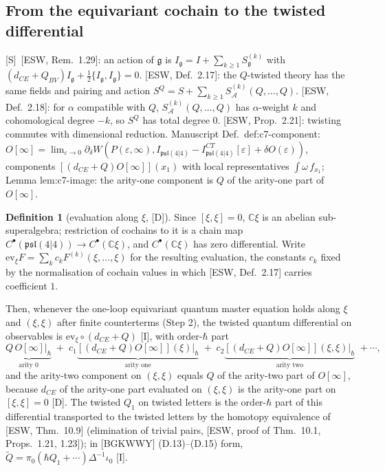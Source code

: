 \documentclass[11pt]{article}
\theoremstyle{definition}
\newtheorem{definition}{Definition}
\newcommand{\Sl}{\textup{[S]}}
\newcommand{\Dl}{\textup{[D]}}
\newcommand{\Il}{\textup{[I]}}
\begin{document}
\subsection{From the equivariant cochain to the twisted differential}

\Sl\ [ESW, Rem.~1.29]: an action of $\mathfrak g$ is $I_{\mathfrak g}=I+\sum_{k\ge1}S^{(k)}_{\mathfrak g}$ with $(d_{CE}+Q_{BV})I_{\mathfrak g}+\tfrac12\{I_{\mathfrak g},I_{\mathfrak g}\}=0$. [ESW, Def.~2.17]: the $Q$-twisted theory has the same fields and pairing and action $S^Q=S+\sum_{k\ge1}S^{(k)}_{\mathcal A}(Q,\dots,Q)$. [ESW, Def.~2.18]: for $\alpha$ compatible with $Q$, $S^{(k)}_{\mathcal A}(Q,\dots,Q)$ has $\alpha$-weight $k$ and cohomological degree $-k$, so $S^Q$ has total degree $0$. [ESW, Prop.~2.21]: twisting commutes with dimensional reduction. Manuscript Def.~def:c7-component: $O[\infty]=\lim_{\varepsilon\to0}\partial_\delta W(P(\varepsilon,\infty),I_{\mathfrak{psl}(4|4)}-I^{CT}_{\mathfrak{psl}(4|4)}[\varepsilon]+\delta O(\varepsilon))$, components $[(d_{CE}+Q)O[\infty]](x_1)$ with local representatives $\int\omega\,f_{x_1}$; Lemma lem:c7-image: the arity-one component is $Q$ of the arity-one part of $O[\infty]$.

\begin{definition}[evaluation along $\xi$, \Dl]
Since $[\xi,\xi]=0$, $\mathbb C\xi$ is an abelian sub-superalgebra; restriction of cochains to it is a chain map $C^\bullet(\mathfrak{psl}(4|4))\to C^\bullet(\mathbb C\xi)$, and $C^\bullet(\mathbb C\xi)$ has zero differential. Write $\mathrm{ev}_\xi F=\sum_k c_kF^{(k)}(\xi,\dots,\xi)$ for the resulting evaluation, the constants $c_k$ fixed by the normalisation of cochain values in which [ESW, Def.~2.17] carries coefficient $1$.
\end{definition}

Then, whenever the one-loop equivariant quantum master equation holds along $\xi$ and $(\xi,\xi)$ after finite counterterms (Step 2), the twisted quantum differential on observables is $\mathrm{ev}_\xi\circ(d_{CE}+Q)$ \Il, with order-$\hbar$ part
\[
\underbrace{Q\,O[\infty]\big|_{\hbar}}_{\text{arity }0}\;+\;c_1\underbrace{[(d_{CE}+Q)O[\infty]](\xi)\big|_\hbar}_{\text{arity one}}\;+\;c_2\underbrace{[(d_{CE}+Q)O[\infty]](\xi,\xi)\big|_\hbar}_{\text{arity two}}\;+\cdots,
\]
and the arity-two component on $(\xi,\xi)$ equals $Q$ of the arity-two part of $O[\infty]$, because $d_{CE}$ of the arity-one part evaluated on $(\xi,\xi)$ is the arity-one part on $[\xi,\xi]=0$ \Dl. The twisted $Q_1$ on twisted letters is the order-$\hbar$ part of this differential transported to the twisted letters by the homotopy equivalence of [ESW, Thm.~10.9] (elimination of trivial pairs, [ESW, proof of Thm.~10.1, Props.~1.21, 1.23]); in [BGKWWY] (D.13)--(D.15) form, $\tilde Q=\pi_0(\hbar Q_1+\cdots)\Delta^{-1}\iota_0$ \Il.
\end{document}
